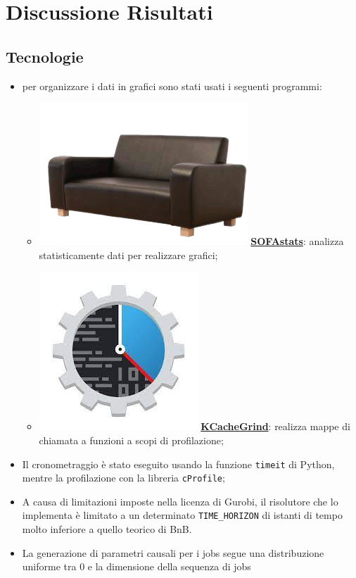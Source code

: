 \documentclass[compress]{beamer}
\begin{document}
\section{Discussione Risultati}

    \subsection{Tecnologie}
    \begin{frame}{\subsecname}
        \begin{itemize}
            \item per organizzare i dati in grafici sono stati usati i seguenti programmi:
            \begin{itemize}
                \item \includegraphics[scale=0.1]{figs/sofastatsLogo.png} \href{https://www.sofastatistics.com/home.php}{\textbf{SOFAstats}}:
                analizza statisticamente dati per realizzare grafici;
                \item \includegraphics[scale=0.1]{figs/kCacheGrindLogo.jpg} \href{https://kcachegrind.github.io/html/Home.html}{\textbf{KCacheGrind}}: realizza mappe di chiamata 
                a funzioni a scopi di profilazione;
            \end{itemize}
            \item Il cronometraggio è stato eseguito usando la funzione \texttt{timeit} di Python,
            mentre la profilazione con la libreria \texttt{cProfile};
            \item A causa di limitazioni imposte nella licenza di Gurobi, il risolutore che lo
            implementa è limitato a un determinato \texttt{TIME\_HORIZON} di istanti di tempo
            molto inferiore a quello teorico di BnB.
            \item La generazione di parametri causali per i jobs segue una distribuzione uniforme tra
            0 e la dimensione della sequenza di jobs

        \end{itemize}
    \end{frame}
\end{document}
